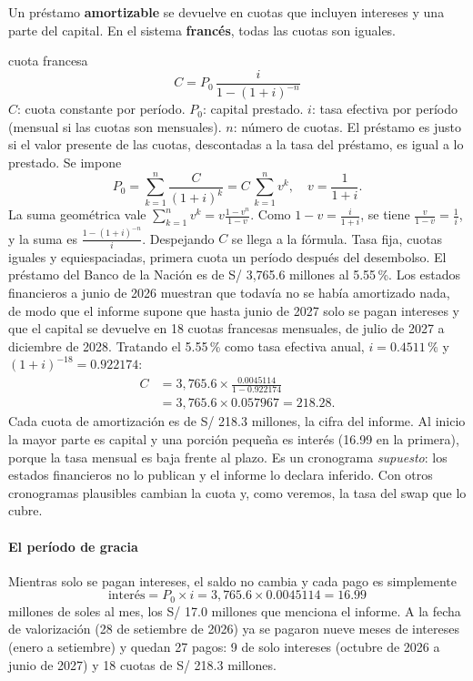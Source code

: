 Un préstamo \textbf{amortizable} se devuelve en cuotas que incluyen intereses y una parte del capital. En el sistema \textbf{francés}, todas las cuotas son iguales.

\begin{ficha}{cuota francesa}
\[ C=P_0\,\frac{i}{1-(1+i)^{-n}} \]
 $C$: cuota constante por período. $P_0$: capital prestado. $i$: tasa efectiva por período (mensual si las cuotas son mensuales). $n$: número de cuotas.
 El préstamo es justo si el valor presente de las cuotas, descontadas a la tasa del préstamo, es igual a lo prestado.
 Se impone
\[ P_0=\sum_{k=1}^{n}\frac{C}{(1+i)^k}=C\,\sum_{k=1}^{n}v^k,\quad v=\frac{1}{1+i}. \]
La suma geométrica vale $\sum_{k=1}^n v^k=v\frac{1-v^n}{1-v}$. Como $1-v=\frac{i}{1+i}$, se tiene $\frac{v}{1-v}=\frac{1}{i}$, y la suma es $\frac{1-(1+i)^{-n}}{i}$. Despejando $C$ se llega a la fórmula.
 Tasa fija, cuotas iguales y equiespaciadas, primera cuota un período después del desembolso.
 El préstamo del Banco de la Nación es de S/ 3,765.6 millones al 5.55\,\%. Los estados financieros a junio de 2026 muestran que todavía no se había amortizado nada, de modo que el informe supone que hasta junio de 2027 solo se pagan intereses y que el capital se devuelve en 18 cuotas francesas mensuales, de julio de 2027 a diciembre de 2028. Tratando el 5.55\,\% como tasa efectiva anual, $i=0.4511\,\%$ y $(1+i)^{-18}=0.922174$:
\begin{align*} C&=3{,}765.6\times\frac{0.0045114}{1-0.922174}\\ &=3{,}765.6\times0.057967=218.28. \end{align*}
 Cada cuota de amortización es de S/ 218.3 millones, la cifra del informe. Al inicio la mayor parte es capital y una porción pequeña es interés (16.99 en la primera), porque la tasa mensual es baja frente al plazo.
 Es un cronograma \emph{supuesto}: los estados financieros no lo publican y el informe lo declara inferido. Con otros cronogramas plausibles cambian la cuota y, como veremos, la tasa del swap que lo cubre.
\end{ficha}

\paragraph{El período de gracia} Mientras solo se pagan intereses, el saldo no cambia y cada pago es simplemente
\[ \text{interés}=P_0\times i=3{,}765.6\times0.0045114=16.99 \]
millones de soles al mes, los S/ 17.0 millones que menciona el informe. A la fecha de valorización (28 de setiembre de 2026) ya se pagaron nueve meses de intereses (enero a setiembre) y quedan 27 pagos: 9 de solo intereses (octubre de 2026 a junio de 2027) y 18 cuotas de S/ 218.3 millones.

